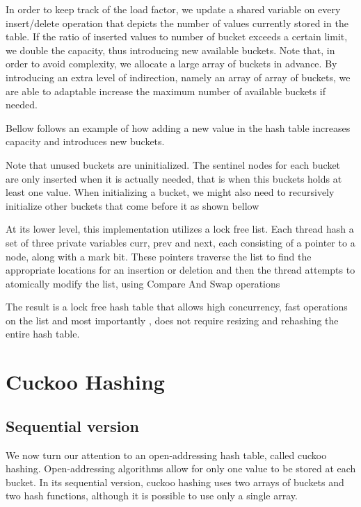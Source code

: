 In order to keep track of the load factor, we update a shared variable on every insert/delete operation that depicts the number of values currently stored in the table. If the ratio of inserted values to number of bucket exceeds a certain limit, we double the capacity, thus introducing new available buckets. Note that, in order to avoid complexity, we allocate a large array of buckets in advance. By introducing an extra level of indirection, namely an array of array of buckets, we are able to adaptable increase the maximum number of available buckets if needed.

Bellow follows an example of how adding a new value in the hash table increases capacity and introduces new buckets.


Note that unused buckets are uninitialized. The sentinel nodes for each bucket are only inserted when it is actually needed, that is when this buckets holds at least one value. When initializing a bucket, we might also need to recursively initialize other buckets that come before it as shown bellow


At its lower level, this implementation utilizes a lock free list. Each thread hash a set of three private variables curr, prev and next, each consisting of a pointer to a node, along with a mark bit. These pointers traverse the list to find the appropriate locations for an insertion or deletion and then the thread attempts to atomically modify the list, using Compare And Swap operations

The result is a lock free hash table that allows high concurrency, fast operations on the list and most importantly , does not require resizing and rehashing the entire hash table.

\section{Cuckoo Hashing}
\subsection{Sequential version}

We now turn our attention to an open-addressing hash table, called cuckoo hashing. Open-addressing algorithms allow for only one value to be stored at each bucket. In its sequential version, cuckoo hashing uses two arrays of buckets and two hash functions, although it is possible to use only a single array. 

